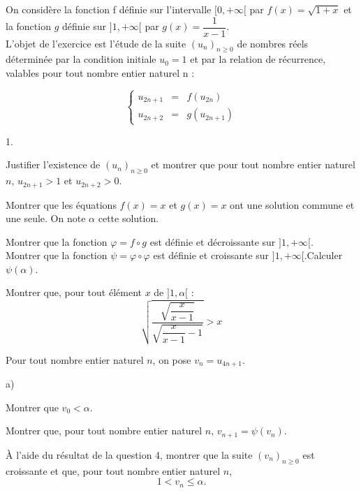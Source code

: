 \documentclass[11pt]{article}%
\begin{document}
On considère la fonction f définie sur l'intervalle $[0, + \infty
\lbrack $
par $f(x) = \sqrt{1 + x}$ et la fonction $g$ définie sur $]1, + \infty
\lbrack $
par $g(x) = \dfrac{1}{x-1}$.\\
L'objet de l'exercice est l'étude de la suite $(u_{n})_{n\geq 0}$ de
nombres réels déterminée par la condition initiale $u_{0} = 1$ et par
la
relation de récurrence, valables pour tout nombre entier naturel n :

\[
\left\{ 
\begin{array}{lll}
u_{2n + 1} & = & f(u_{2n}) \\
u_{2n + 2} & = & g(u_{2n + 1})
\end{array}
\right. 
\]

\begin{noliste}{1.}
 \setlength{\itemsep}{4mm}
\item Justifier l'existence de $(u_{n})_{n\geq 0}$ et montrer que pour
tout nombre entier naturel $n$, $u_{2n + 1}>1$ et $u_{2n + 2}>0$.

\item Montrer que les équations $f(x) = x$ et $g(x) = x$ ont une
solution
commune et une seule. On note $\alpha $ cette solution.

\item Montrer que la fonction $\varphi = f\circ g$ est définie et
décroissante sur $]1, + \infty \lbrack $.\\
Montrer que la fonction $\psi = \varphi \circ \varphi $ est définie et
croissante sur $]1, + \infty \lbrack $.Calculer $\psi (\alpha )$.

\item Montrer que, pour tout élément $x$ de $]1,\alpha \lbrack $ :
\[
\sqrt{\dfrac{\sqrt{\dfrac{x}{x-1}}}{\sqrt{\dfrac{x}{x-1}-1}}}>x
\]

\item Pour tout nombre entier naturel $n$, on pose $v_{n} = u_{4n +
1}$.

\begin{noliste}{a)}
 \setlength{\itemsep}{2mm}
\item Montrer que $v_{0}<\alpha $.

\item Montrer que, pour tout nombre entier naturel $n$, $v_{n + 1} =
\psi (v_{n})
$.

\item À l'aide du résultat de la question 4, montrer que la suite
$(v_{n})_{n\geq 0}$ est croissante et que, pour tout nombre entier
naturel $n$, 
\[
1<v_{n}\leq \alpha.
\]


\end{noliste}
\end{noliste}
\end{document}
